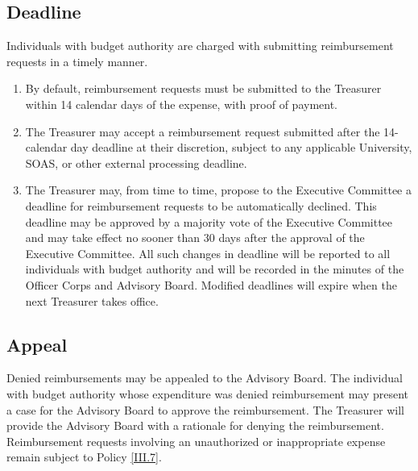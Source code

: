 \subsection{Deadline} \label{VI.6}
Individuals with budget authority are charged with submitting reimbursement requests in a timely manner.
\begin{enumerate}
    \item By default, reimbursement requests must be submitted to the Treasurer within 14 calendar days of the expense, with proof of payment.
    \item The Treasurer may accept a reimbursement request submitted after the 14-calendar day deadline at their discretion, subject to any applicable University, SOAS, or other external processing deadline.
    \item The Treasurer may, from time to time, propose to the Executive Committee a deadline for reimbursement requests to be automatically declined. 
    This deadline may be approved by a majority vote of the Executive Committee and may take effect no sooner than 30 days after the approval of the Executive Committee. 
    All such changes in deadline will be reported to all individuals with budget authority and will be recorded in the minutes of the Officer Corps and Advisory Board. 
    Modified deadlines will expire when the next Treasurer takes office.
\end{enumerate}

\subsection{Appeal} \label{VI.7}
Denied reimbursements may be appealed to the Advisory Board. The individual with budget authority whose expenditure was denied reimbursement may present a 
case for the Advisory Board to approve the reimbursement. The Treasurer will provide the Advisory Board with a rationale for denying the reimbursement. 
Reimbursement requests involving an unauthorized or inappropriate expense remain subject to Policy \ref{III.7}.